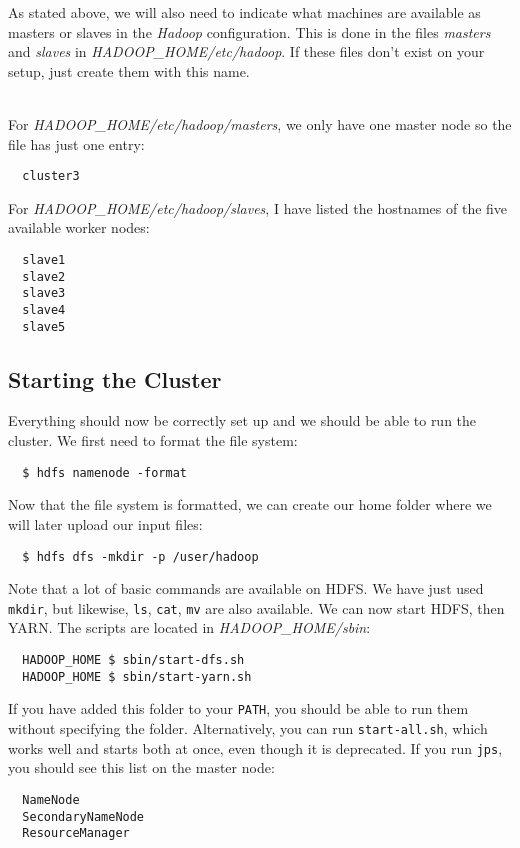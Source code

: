 \documentclass[a4paper, 12pt]{article}
\begin{document}
As stated above, we will also need to indicate what machines are available as masters or slaves in the \textit{Hadoop} configuration. This is done in the files \textit{masters} and \textit{slaves} in \textit{HADOOP\_HOME/etc/hadoop}. If these files don't exist on your setup, just create them with this name.

~\\
For \textit{HADOOP\_HOME/etc/hadoop/masters}, we only have one master node so the file has just one entry:

\begin{verbatim}
  cluster3
\end{verbatim}

For \textit{HADOOP\_HOME/etc/hadoop/slaves}, I have listed the hostnames of the five available worker nodes:

\begin{verbatim}
  slave1
  slave2
  slave3
  slave4
  slave5
\end{verbatim}

  \subsection{Starting the Cluster}
  
Everything should now be correctly set up and we should be able to run the cluster. We first need to format the file system:

\begin{verbatim}
  $ hdfs namenode -format
\end{verbatim}

Now that the file system is formatted, we can create our home folder where we will later upload our input files:

\begin{verbatim}
  $ hdfs dfs -mkdir -p /user/hadoop
\end{verbatim}

Note that a lot of basic commands are available on HDFS. We have just used \texttt{mkdir}, but likewise, \texttt{ls}, \texttt{cat}, \texttt{mv} are also available. We can now start HDFS, then YARN. The scripts are located in \textit{HADOOP\_HOME/sbin}:

\begin{verbatim}
  HADOOP_HOME $ sbin/start-dfs.sh
  HADOOP_HOME $ sbin/start-yarn.sh
\end{verbatim}

If you have added this folder to your \texttt{PATH}, you should be able to run them without specifying the folder. Alternatively, you can run \texttt{start-all.sh}, which works well and starts both at once, even though it is deprecated. If you run \texttt{jps}, you should see this list on the master node:
\begin{verbatim}
  NameNode
  SecondaryNameNode
  ResourceManager
\end{verbatim}
\end{document}
